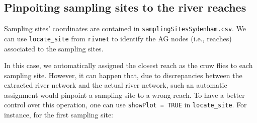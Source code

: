 \documentclass[
]{article}
\newenvironment{Shaded}{\begin{snugshade}}{\end{snugshade}}
\newcommand{\AttributeTok}[1]{\textcolor[rgb]{0.13,0.29,0.53}{#1}}
\newcommand{\ControlFlowTok}[1]{\textcolor[rgb]{0.13,0.29,0.53}{\textbf{#1}}}
\newcommand{\DecValTok}[1]{\textcolor[rgb]{0.00,0.00,0.81}{#1}}
\newcommand{\FunctionTok}[1]{\textcolor[rgb]{0.13,0.29,0.53}{\textbf{#1}}}
\newcommand{\NormalTok}[1]{#1}
\newcommand{\OtherTok}[1]{\textcolor[rgb]{0.56,0.35,0.01}{#1}}
\newcommand{\SpecialCharTok}[1]{\textcolor[rgb]{0.81,0.36,0.00}{\textbf{#1}}}
\newcommand{\StringTok}[1]{\textcolor[rgb]{0.31,0.60,0.02}{#1}}
\begin{document}
\hypertarget{pinpoiting-sampling-sites-to-the-river-reaches}{%
\subsection{Pinpoiting sampling sites to the river reaches}\label{pinpoiting-sampling-sites-to-the-river-reaches}}

Sampling sites' coordinates are contained in \texttt{samplingSitesSydenham.csv}. We can use \texttt{locate\_site} from \texttt{rivnet} to identify the AG nodes (i.e., reaches) associated to the sampling sites.

\begin{Shaded}
\end{Shaded}

In this case, we automatically assigned the closest reach as the crow flies to each sampling site. However, it can happen that, due to discrepancies between the extracted river network and the actual river network, such an automatic assignment would pinpoint a sampling site to a wrong reach. To have a better control over this operation, one can use \texttt{showPlot\ =\ TRUE} in \texttt{locate\_site}. For instance, for the first sampling site:

\begin{Shaded}
\end{Shaded}
\end{document}
